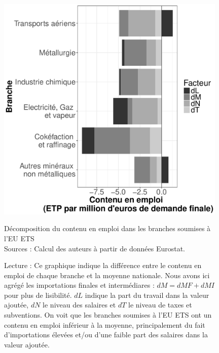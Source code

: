 \begin{figure}[!h]
	\centering
	\includegraphics[height=11cm]{figures/GES_et_emplois/EU_ETS.pdf}
	\caption{Décomposition du contenu en emploi dans les branches soumises à l'EU ETS \\
		Sources : Calcul des auteurs à partir de données Eurostat.}
	\label{fig:EU ETS}
	\captionsetup{justification=raggedright}
	\caption*{Lecture : Ce graphique indique la différence entre le contenu en emploi de chaque branche et la moyenne nationale. Nous avons ici agrégé les importations finales et intermédiares : $dM = dMF + dMI$ pour plus de lisibilité. $dL$ indique la part du travail dans la valeur ajoutée, $dN$ le niveau des salaires et $dT$ le niveau de taxes et subventions. On voit que les branches soumises à l'EU ETS ont un contenu en emploi inférieur à la moyenne, principalement du fait d'importations élevées et/ou d'une faible part des salaires dans la valeur ajoutée.}
\end{figure}

